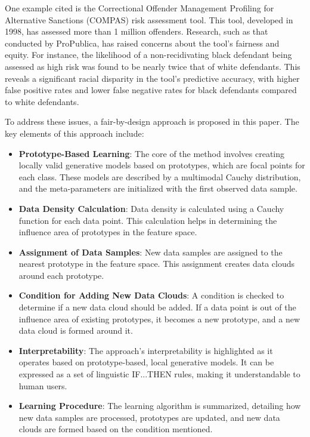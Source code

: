 \documentclass{article}
\begin{document}
One example cited is the Correctional Offender Management Profiling for Alternative Sanctions (COMPAS) risk assessment tool. This tool, developed in 1998, has assessed more than 1 million offenders. Research, such as that conducted by ProPublica, has raised concerns about the tool's fairness and equity. For instance, the likelihood of a non-recidivating black defendant being assessed as high risk was found to be nearly twice that of white defendants. This reveals a significant racial disparity in the tool's predictive accuracy, with higher false positive rates and lower false negative rates for black defendants compared to white defendants. 

To address these issues, a fair-by-design approach is proposed in this paper. The key elements of this approach include:

\begin{itemize}

    \item \textbf{Prototype-Based Learning}: The core of the method involves creating locally valid generative models based on prototypes, which are focal points for each class. These models are described by a multimodal Cauchy distribution, and the meta-parameters are initialized with the first observed data sample.
  

    \item \textbf{Data Density Calculation}: Data density is calculated using a Cauchy function for each data point. This calculation helps in determining the influence area of prototypes in the feature space.
  

    \item \textbf{Assignment of Data Samples}: New data samples are assigned to the nearest prototype in the feature space. This assignment creates data clouds around each prototype.
  

    \item \textbf{Condition for Adding New Data Clouds}: A condition is checked to determine if a new data cloud should be added. If a data point is out of the influence area of existing prototypes, it becomes a new prototype, and a new data cloud is formed around it.


    \item \textbf{Interpretability}: The approach's interpretability is highlighted as it operates based on prototype-based, local generative models. It can be expressed as a set of linguistic IF...THEN rules, making it understandable to human users.
  

    \item \textbf{Learning Procedure}: The learning algorithm is summarized, detailing how new data samples are processed, prototypes are updated, and new data clouds are formed based on the condition mentioned.

\end{itemize}
\end{document}
